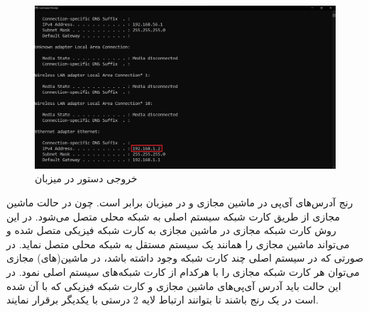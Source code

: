 \documentclass{article}
\begin{document}
\begin{figure}[H]
    \centering
    \includegraphics[width=1.0\textwidth]{figures/2d.jpg}
    \caption
	{
خروجی دستور  در میزبان
	}
    \label{fig:fig1}
\end{figure}
رنج آدرس‌های آی‌پی در ماشین مجازی و در میزبان برابر است. چون در حالت  ماشین مجازی از طریق کارت شبکه سیستم اصلی به شبکه محلی متصل می‌شود. در این روش کارت شبکه مجازی در ماشین مجازی به کارت شبکه فیزیکی متصل شده و می‌تواند ماشین مجازی را همانند یک سیستم مستقل به شبکه محلی متصل نماید. در صورتی که در سیستم اصلی چند کارت شبکه وجود داشته باشد، در ماشین(های) مجازی می‌توان هر کارت شبکه مجازی را با هرکدام از کارت شبکه‌های سیستم اصلی  نمود. در این حالت باید آدرس آی‌پی‌های ماشین مجازی و کارت شبکه فیزیکی که با آن  شده است در یک رنج باشند تا بتوانند ارتباط لایه 2 درستی با یکدیگر برقرار نمایند.
\end{document}
